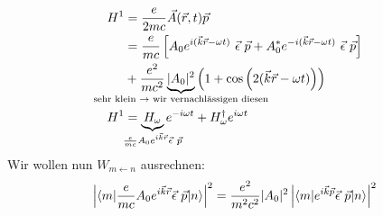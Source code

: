 		\begin{align*}
			H^1 &= \frac{e}{2 m c} \vec{A} (\vec{r} , t) \vec{p} \\
			&= \frac{e}{m c}
			\left[A_0 e^{i(\vec{k} \vec{r} - \omega t)} ~\vec{\epsilon}~\vec{p}
			+ A^*_0 e^{-i(\vec{k} \vec{r} - \omega t)} ~\vec{\epsilon}~\vec{p}
			\right] \\
			&+ \frac{e^2}{m c^2} \underbrace{|A_0|^2}_{\mathclap{\text{sehr klein~} \rightarrow \text{~wir vernachlässigen diesen}}} 
			\left(1 + \cos \left(2 (\vec{k} \vec{r} - \omega t)\right)\right) \\
			H^1 &= \underbrace{H_\omega}_{\mathclap{\frac{e}{m c} A_0 e^{i \vec{k} \vec{r}} \vec{\epsilon}~\vec{p}}} 
			e^{-i \omega t} 
			+ H_\omega^\dagger e^{i \omega t}
		\end{align*}
	Wir wollen nun $W_{m \leftarrow n}$ ausrechnen:
		\begin{align*}
			\left|\braket{m | \frac{e}{m c} A_0 e^{i \vec{k} \vec{r}} \vec{\epsilon}~\vec{p} |n}\right|^2
			= \frac{e^2}{m^2 c^2} |A_0|^2 \left| \braket{m | e^{i \vec{k} \vec{p}} \vec{\epsilon}~\vec{p} | n}\right|^2
		\end{align*}
	
	